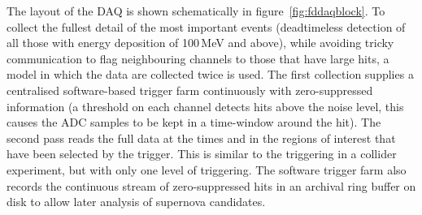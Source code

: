 The layout of the DAQ is shown schematically in
figure~\ref{fig:fddaqblock}.  To collect the fullest detail of the
most important events (deadtimeless detection of all those with energy
deposition of 100\,MeV and above), while avoiding tricky communication
to flag neighbouring channels to those that have large hits, a model
in which the data are collected twice is used.  The first collection
supplies a centralised software-based trigger farm continuously with
zero-suppressed information (a threshold on each channel detects hits
above the noise level, this causes the ADC samples to be kept in a
time-window around the hit).  
The second pass reads the full data at the times and
in the regions of interest that have been selected by the
trigger. This is similar to the triggering in a collider experiment,
but with only one level of triggering.  The software trigger farm also
records the continuous stream of zero-suppressed hits in an archival
ring buffer on disk to allow later analysis of supernova candidates.

